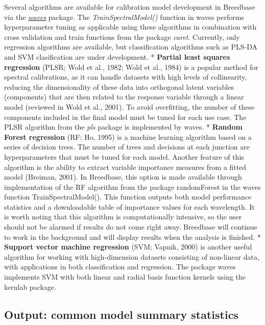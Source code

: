 \documentclass[
  12pt,
]{book}
\begin{document}
Several algorithms are available for calibration model development in Breedbase via the \href{https://CRAN.R-project.org/package=waves}{\emph{waves}} package. The \emph{TrainSpectralModel()} function in waves performs hyperparameter tuning as applicable using these algorithms in combination with cross validation and train functions from the package \emph{caret}. Currently, only regression algorithms are available, but classification algorithms such as PLS-DA and SVM clasification are under development. * \textbf{Partial least squares regression} (PLSR; Wold et al., 1982; Wold et al., 1984) is a popular method for spectral calibrations, as it can handle datasets with high levels of collinearity, reducing the dimensionality of these data into orthogonal latent variables (components) that are then related to the response variable through a linear model (reviewed in Wold et al., 2001). To avoid overfitting, the number of these components included in the final model must be tuned for each use case. The PLSR algorithm from the \emph{pls} package is implemented by waves. * \textbf{Random Forest regression} (RF; Ho, 1995) is a machine learning algorithm based on a series of decision trees. The number of trees and decisions at each junction are hyperparameters that must be tuned for each model. Another feature of this algorithm is the ability to extract variable importance measures from a fitted model (Breiman, 2001). In Breedbase, this option is made available through implementation of the RF algorithm from the package randomForest in the waves function TrainSpectralModel(). This function outputs both model performance statistics and a downloadable table of importance values for each wavelength. It is worth noting that this algorithm is computationally intensive, so the user should not be alarmed if results do not come right away. Breedbase will continue to work in the background and will display results when the analysis is finished. * \textbf{Support vector machine regression} (SVM; Vapnik, 2000) is another useful algorithm for working with high-dimension datasets consisting of non-linear data, with applications in both classification and regression. The package waves implements SVM with both linear and radial basis function kernels using the kernlab package.

\hypertarget{output-common-model-summary-statistics}{%
\subsection{Output: common model summary statistics}\label{output-common-model-summary-statistics}}
\end{document}
